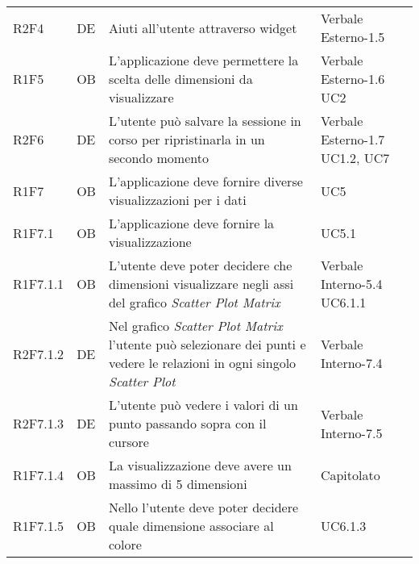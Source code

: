 {\begin{longtable}{C{2cm} | C{1.5cm} | C{9cm} | C{3.3cm}}
R2F4 & DE & Aiuti all'utente attraverso widget & Verbale Esterno-1.5 \\
R1F5 & OB & L'applicazione deve permettere la scelta delle dimensioni da visualizzare & Verbale Esterno-1.6 \newline UC2\\
R2F6 & DE & L'utente può salvare la sessione in corso per ripristinarla in un secondo momento & Verbale Esterno-1.7 \newline UC1.2, UC7\\
R1F7 & OB & L'applicazione deve fornire diverse visualizzazioni per i dati & UC5\\
R1F7.1 & OB & L'applicazione deve fornire la visualizzazione  & UC5.1\\
R1F7.1.1 & OB & L'utente deve poter decidere che dimensioni visualizzare negli assi del grafico \textit{Scatter Plot Matrix} & Verbale Interno-5.4 \newline UC6.1.1\\
R2F7.1.2 & DE & Nel grafico \textit{Scatter Plot Matrix} l'utente può selezionare dei punti e vedere le relazioni in ogni singolo \textit{Scatter Plot} & Verbale Interno-7.4\\
R2F7.1.3 & DE & L'utente può vedere i valori di un punto passando sopra con il cursore & Verbale Interno-7.5\\

R1F7.1.4 & OB & La visualizzazione  deve avere un massimo di 5 dimensioni & Capitolato\\

R1F7.1.5 & OB & Nello  l'utente deve poter decidere quale dimensione associare al colore & UC6.1.3\\


\end{longtable}}
